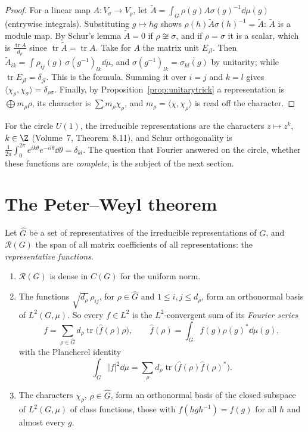 \begin{proof}
For a linear map $A:V_\sigma\to V_\rho$, let $\tilde A=\int_G\rho(g)A\sigma(g)^{-1}\dd\mu(g)$ (entrywise integrals). Substituting $g\mapsto hg$ shows $\rho(h)\tilde A\sigma(h)^{-1}=\tilde A$: $\tilde A$ is a module map. By Schur's lemma $\tilde A=0$ if $\rho\not\cong\sigma$,
and if $\rho=\sigma$ it is a scalar, which is $\frac{\operatorname{tr}A}{d_\rho}$ since $\operatorname{tr}\tilde A=\operatorname{tr}A$. Take for $A$ the matrix unit $E_{jl}$. Then $\tilde A_{ik}=\int\rho_{ij}(g)\,\sigma(g^{-1})_{lk}\dd\mu$, and $\sigma(g^{-1})_{lk}=\overline{\sigma_{kl}(g)}$
by unitarity; while $\operatorname{tr}E_{jl}=\delta_{jl}$. This is the formula. Summing it over $i=j$ and $k=l$ gives $\langle\chi_\rho,\chi_\sigma\rangle=\delta_{\rho\sigma}$. Finally, by Proposition~\ref{prop:unitarytrick} a representation is $\bigoplus m_\rho\rho$, its
character is $\sum m_\rho\chi_\rho$, and $m_\rho=\langle\chi,\chi_\rho\rangle$ is read off the character.
\end{proof}

For the circle $U(1)$, the irreducible representations are the characters $z\mapsto z^k$, $k\in\Z$ (Volume~7, Theorem~8.11), and Schur orthogonality is $\frac1{2\pi}\int_0^{2\pi}e^{ik\theta}e^{-il\theta}\dd\theta=\delta_{kl}$. The question that Fourier answered on the
circle, whether these functions are \emph{complete}, is the subject of the next section.

\section{The Peter--Weyl theorem}

Let $\widehat G$ be a set of representatives of the irreducible representations of $G$, and $\mathcal R(G)$ the span of all matrix coefficients of all representations: the \emph{representative functions}.

\begin{theorem}\label{thm:peterweyl}
\begin{enumerate}[label=(\alph*)]
\item $\mathcal R(G)$ is dense in $C(G)$ for the uniform norm.
\item The functions $\sqrt{d_\rho}\,\rho_{ij}$, for $\rho\in\widehat G$ and $1\le i,j\le d_\rho$, form an orthonormal basis of $L^2(G,\mu)$. So every $f\in L^2$ is the $L^2$-convergent sum of its \emph{Fourier series}
\[
f=\sum_{\rho\in\widehat G}d_\rho\operatorname{tr}\bigl(\hat f(\rho)\rho\bigr),\qquad\hat f(\rho)=\int_Gf(g)\rho(g)^*\dd\mu(g),
\]
with the Plancherel identity
\[
\int_G|f|^2\dd\mu=\sum_\rho d_\rho\operatorname{tr}\bigl(\hat f(\rho)\hat f(\rho)^*\bigr).
\]
\item The characters $\chi_\rho$, $\rho\in\widehat G$, form an orthonormal basis of the closed subspace of $L^2(G,\mu)$ of class functions, those with $f(hgh^{-1})=f(g)$ for all $h$ and almost every $g$.
\end{enumerate}
\end{theorem}

